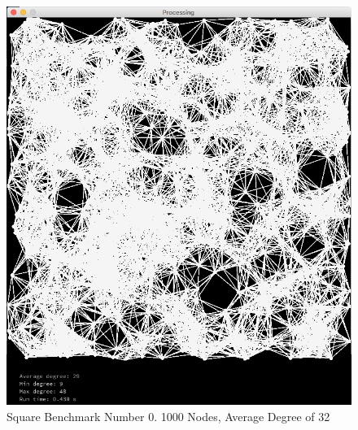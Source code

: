 \documentclass{article}
\begin{document}
\begin{center}
    \begin{figure}
        \includegraphics[scale=0.25]{./images/square_0.png}
        \caption{Square Benchmark Number 0. 1000 Nodes, Average Degree of 32}
        \label{square0}
    \end{figure}
\end{center}
\end{document}
